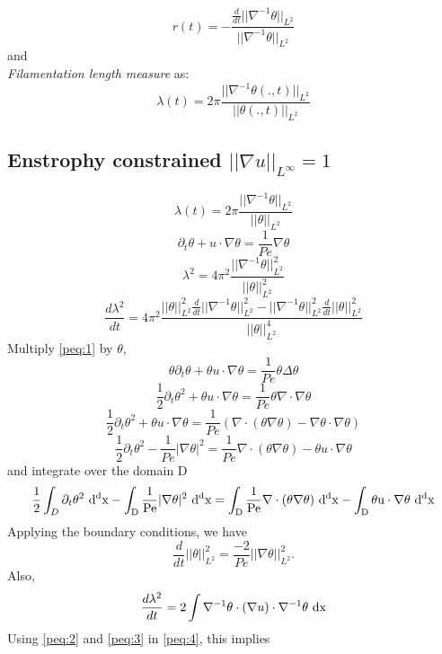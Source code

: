\documentclass[12pt]{report}   %
\numberwithin{equation}{section}
\theoremstyle{plain}
\theoremstyle{definition}
\theoremstyle{remark}
\begin{document}
 \begin{equation} r(t) = - \frac{\frac{d}{dt}||\nabla^{-1}\theta||_{L^2}}{||\nabla^{-1}\theta||_{L^2}}
 \end{equation}
 and  \\
 \textit{ Filamentation length measure} as:
\begin{equation}
\lambda(t) = 2\pi \frac{||\nabla^{-1}\theta(.,t)||_{L^2}}{||\theta(.,t)||_{L^2}} \label{peq:12}
\end{equation}
 
 \subsection{ Enstrophy constrained $||\nabla u||_{L^\infty} = 1$}
  \[\lambda(t) = 2\pi\frac{||\nabla^{-1}\theta||_{L^2}}{||\theta||_{L^2}}\]
  \[ \partial_t\theta + u\cdot\nabla\theta = \frac{1}{Pe}\nabla\theta\]
  \[\lambda^2 = 4\pi^2 \frac{||\nabla^{-1}\theta||_{L^2}^{2}}{||\theta||_{L^2}^{2}} \]
  \begin{equation}
  \frac{d\lambda^2}{dt} = 4\pi^2\frac{||\theta||_{L^2}^{2}\frac{d}{dt}||\nabla^{-1}\theta||_{L^2}^2 - ||\nabla^{-1}\theta||_{L^2}^2\frac{d}{dt}||\theta||_{L^2}^2}{||\theta||_{L^2}^{4}} \label{peq:4}
  \end{equation}
  Multiply \eqref{peq:1} by $\theta$,
\[ \theta\partial_t\theta +  \theta u\cdot\nabla\theta = \frac{1}{Pe}\theta\Delta\theta \]
\[\frac{1}{2}\partial_t\theta^2 + \theta u\cdot\nabla\theta = \frac{1}{Pe}\theta\nabla\cdot\nabla\theta \]
\[\frac{1}{2}\partial_t\theta^2 + \theta u\cdot\nabla\theta = \frac{1}{Pe}\left(
\nabla\cdot(\theta\nabla\theta) - \nabla\theta\cdot\nabla\theta \right) \]
\[\frac{1}{2}\partial_t\theta^2  - \frac{1}{Pe}|\nabla\theta|^2 = \frac{1}{Pe}\nabla\cdot(\theta\nabla\theta) - \theta u\cdot\nabla\theta\]
and integrate over the domain D 
\[\frac{1}{2}\int_D\partial_t\theta^2 ~\rm{d}^dx - \int_D\frac{1}{Pe}|\nabla\theta|^2 ~\rm{d}^dx = \int_D\frac{1}{Pe}\nabla\cdot(\theta\nabla\theta) ~\rm{d}^dx- \int_D\theta u\cdot\nabla\theta ~\rm{d}^dx\]
Applying the boundary conditions, we have
\begin{equation}
\frac{d}{dt}||\theta||_{L^2}^2 = \frac{-2}{Pe}||\nabla\theta||_{L^2}^2 .\label{peq:2}
\end{equation}
Also,
\begin{equation}
\frac{d\lambda^2}{dt} =  2\int \nabla^{-1}\theta \cdot (\nabla u) \cdot \nabla^{-1}\theta ~\rm{d}x \label{peq:3}
\end{equation}
Using \eqref{peq:2} and \eqref{peq:3} in  \eqref{peq:4}, this implies
\end{document}
